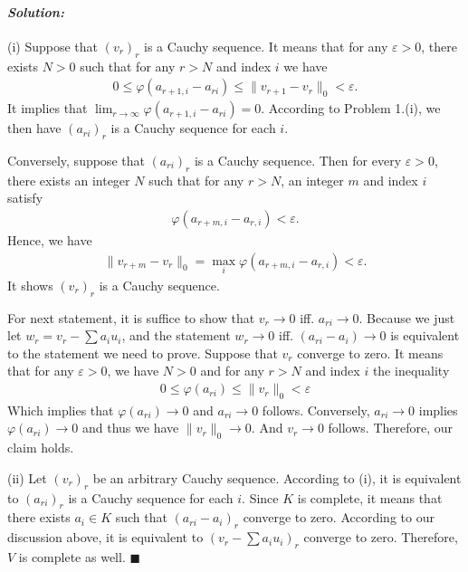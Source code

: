 \documentclass[12pt, a4paper]{article}
\theoremstyle{remark}
\newenvironment{solution}
  {\paragraph{\textit{Solution:}}\par\medskip}
  {\hfill$\blacksquare$\vspace{0.1cm}}
\begin{document}
\begin{solution}
    (i) Suppose that $(v_r)_r$ is a Cauchy sequence. It means that for any $\varepsilon>0$, there exists $N>0$ such that for any $r>N$ and index $i$ we have 
    \begin{align*}
       0\le \varphi(a_{r+1,i}-a_{ri})\le \|v_{r+1}-v_r\|_0  <\varepsilon.
    \end{align*}
    It implies that $\lim_{r\to\infty}\varphi(a_{r+1,i}-a_{ri}) = 0$. According to Problem 1.(i), we then have $(a_{ri})_r$ is a Cauchy sequence for each $i$.
    
    Conversely, suppose that $(a_{ri})_r$ is a Cauchy sequence. Then for every $\varepsilon>0$, there exists an integer $N$ such that for any $r>N$, an integer $m$ and index $i$ satisfy 
    \begin{align*}
        \varphi(a_{r+m,i}-a_{r,i})<\varepsilon.
    \end{align*}
    Hence, we have 
    \begin{align*}
        \|v_{r+m}-v_r\|_0 = \max_{i}\varphi(a_{r+m,i}-a_{r,i})<\varepsilon.
    \end{align*}
    It shows $(v_r)_r$ is a Cauchy sequence.

    For next statement, it is suffice to show that $v_r \to 0$ iff. $a_{ri}\to 0$. 
    Because we just let $w_r = v_r - \sum a_iu_i$, and the statement $w_r\to 0$ iff. $(a_{ri}-a_i) \to 0$ is equivalent to the statement we need to prove.
    Suppose that $v_r$ converge to zero. It means that for any $\varepsilon>0$, we have $N>0$ and for any $r>N$ and index $i$ the inequality
    \begin{align*}
        0\le \varphi(a_{ri})\le \|v_r\|_0<\varepsilon
    \end{align*}
    Which implies that $\varphi(a_{ri})\to 0$ and $a_{ri}\to 0$ follows. Conversely, $a_{ri}\to 0$ implies $\varphi(a_{ri})\to 0$ and thus we have $\|v_r\|_0\to 0$. And $v_r\to 0$ follows.
    Therefore, our claim holds.


    (ii) Let $(v_r)_r$ be an arbitrary Cauchy sequence. According to (i), it is equivalent to $(a_{ri})_r$ is a Cauchy sequence for each $i$.
    Since $K$ is complete, it means that there exists $a_i\in K$ such that $(a_{ri}-a_i)_r$ converge to zero. According to our discussion above, it is equivalent to 
    $(v_r-\sum a_iu_i)_r$ converge to zero. Therefore, $V$ is complete as well. 
\end{solution}
\end{document}
